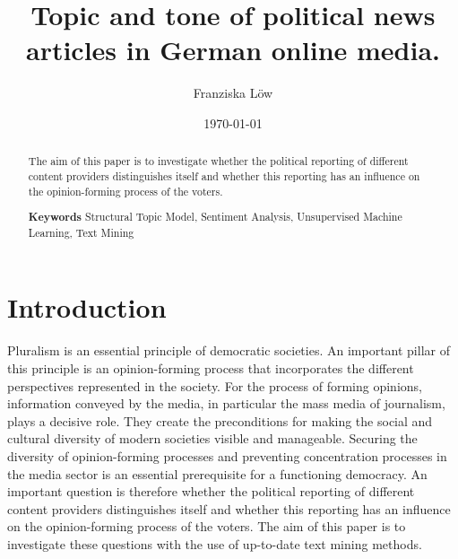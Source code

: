 \documentclass[12pt,a4paper,notitlepage]{article}
\title{Topic and tone of political news articles in German online media.}
\date{\today}
\author{Franziska Löw}
\begin{document}
\begin{titlepage}
	\maketitle
	\begin{abstract}
		The aim of this paper is to investigate whether the political reporting of different content providers distinguishes itself and whether this reporting has an influence on the opinion-forming process of the voters. 
		
		\textbf{Keywords} Structural Topic Model, Sentiment Analysis, Unsupervised Machine Learning, Text Mining

	\end{abstract}

\end{titlepage}

\section{Introduction}

Pluralism is an essential principle of democratic societies. An important pillar of this principle is an opinion-forming process that incorporates the different perspectives represented in the society. For the process of forming opinions, information conveyed by the media, in particular the mass media of journalism, plays a decisive role. They create the preconditions for making the social and cultural diversity of modern societies visible and manageable. Securing the diversity of opinion-forming processes and preventing concentration processes in the media sector is an essential prerequisite for a functioning democracy. An important question is therefore whether the political reporting of different content providers distinguishes itself and whether this reporting has an influence on the opinion-forming process of the voters. The aim of this paper is to investigate these questions with the use of up-to-date text mining methods.  
\end{document}
